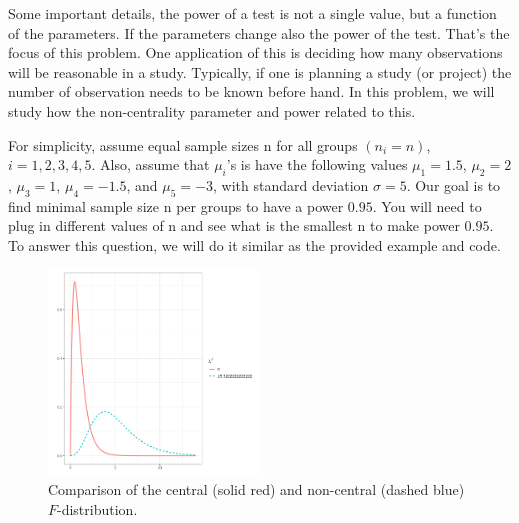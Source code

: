 \documentclass{article}
\begin{document}
Some important details, the power of a test is not a single value, but a function of the parameters.
If the parameters change also the power of the test.
That’s the focus of this problem. One application of this is deciding how many observations will be
reasonable in a study. Typically, if one is planning a study (or project) the number of observation
needs to be known before hand. In this problem, we will study how the non-centrality parameter
and power related to this.

For simplicity, assume equal sample sizes n for all groups $(n_i = n)$, $i = 1, 2, 3, 4, 5$. Also, assume
that $\mu_i$'s is have the following values $\mu_1 = 1.5$, $\mu_2 = 2$, $\mu_3 = 1$, $\mu_4 = -1.5$, and $\mu_5 = -3$, with standard
deviation $\sigma = 5$. Our goal is to find minimal sample size n per groups to have a power $0.95$. You
will need to plug in different values of n and see what is the smallest n to make power $0.95$. To
answer this question, we will do it similar as the provided example and code.
\begin{figure}[H]
	\centering
	\includegraphics[width=0.5\textwidth]{assets/prob6.png}
	\caption{Comparison of the central (solid red) and non-central (dashed blue) $F$-distribution.}
\end{figure}
\end{document}

